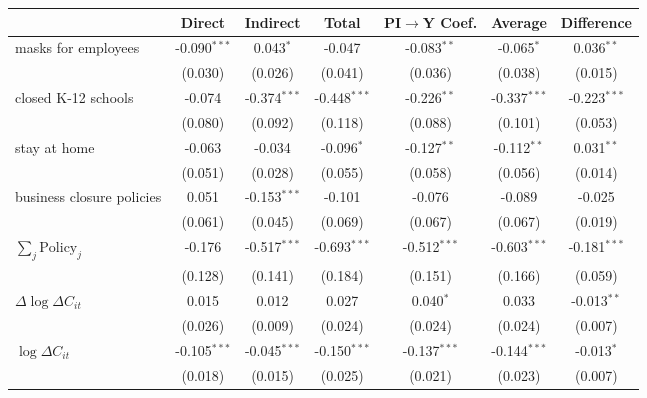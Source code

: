 
\begin{tabular}{lccccc|>{}c}
\toprule
  & Direct & Indirect & Total & PI$\to$Y Coef. & Average & Difference\\
\midrule
masks for employees & -0.090$^{***}$ & 0.043$^{*}$ & -0.047 & -0.083$^{**}$ & -0.065$^{*}$ & 0.036$^{**}$\\
 & (0.030) & (0.026) & (0.041) & (0.036) & (0.038) & (0.015)\\
closed K-12 schools & -0.074 & -0.374$^{***}$ & -0.448$^{***}$ & -0.226$^{**}$ & -0.337$^{***}$ & -0.223$^{***}$\\
 & (0.080) & (0.092) & (0.118) & (0.088) & (0.101) & (0.053)\\
stay at home & -0.063 & -0.034 & -0.096$^{*}$ & -0.127$^{**}$ & -0.112$^{**}$ & 0.031$^{**}$\\
 & (0.051) & (0.028) & (0.055) & (0.058) & (0.056) & (0.014)\\
business closure policies & 0.051 & -0.153$^{***}$ & -0.101 & -0.076 & -0.089 & -0.025\\
 & (0.061) & (0.045) & (0.069) & (0.067) & (0.067) & (0.019)\\
$\sum_j \mathrm{Policy}_j$ & -0.176 & -0.517$^{***}$ & -0.693$^{***}$ & -0.512$^{***}$ & -0.603$^{***}$ & -0.181$^{***}$\\
 & (0.128) & (0.141) & (0.184) & (0.151) & (0.166) & (0.059)\\
$\Delta \log \Delta C_{it}$ & 0.015 & 0.012 & 0.027 & 0.040$^{*}$ & 0.033 & -0.013$^{**}$\\
 & (0.026) & (0.009) & (0.024) & (0.024) & (0.024) & (0.007)\\
$\log \Delta C_{it}$ & -0.105$^{***}$ & -0.045$^{***}$ & -0.150$^{***}$ & -0.137$^{***}$ & -0.144$^{***}$ & -0.013$^{*}$\\
 & (0.018) & (0.015) & (0.025) & (0.021) & (0.023) & (0.007)\\
\bottomrule
\end{tabular}